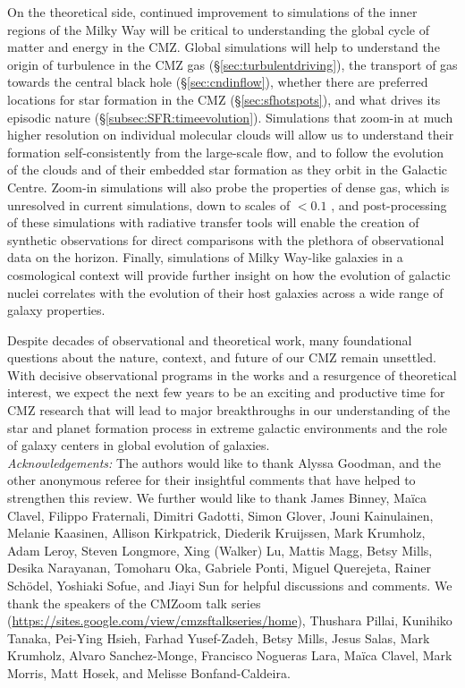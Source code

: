 On the theoretical side, continued improvement to simulations of the inner regions of the Milky Way will be critical to understanding the global cycle of matter and energy in the CMZ. Global simulations  will help to understand the origin of turbulence in the CMZ gas (\S\ref{sec:turbulentdriving}), the transport of gas towards the central black hole (\S\ref{sec:cndinflow}), whether there are preferred locations for star formation in the CMZ (\S\ref{sec:sfhotspots}), and what drives its episodic nature (\S\ref{subsec:SFR:timeevolution}). Simulations that zoom-in at much higher resolution on individual molecular clouds will allow us to understand their formation self-consistently from the large-scale flow, and to follow the evolution of the clouds and of their embedded star formation as they orbit in the Galactic Centre. Zoom-in simulations will also probe the properties of dense gas, which is unresolved in current simulations, down to scales of $<0.1$ \pc, and post-processing of these simulations with radiative transfer tools will enable the creation of synthetic observations for direct comparisons with the plethora of observational data on the horizon. Finally, simulations of Milky Way-like galaxies in a cosmological context will provide further insight on how the evolution of galactic nuclei correlates with the evolution of their host galaxies across a wide range of galaxy properties.

Despite decades of observational and theoretical work, many foundational questions about the nature, context, and future of our CMZ remain unsettled. With decisive observational programs in the works and a resurgence of theoretical interest, we expect the next few years to be an exciting and productive time for CMZ research that will lead to major breakthroughs in our understanding of the star and planet formation process in extreme galactic environments and the role of galaxy centers in global evolution of galaxies.
\\

\noindent\textit{Acknowledgements: } The authors would like to thank Alyssa Goodman, and the other anonymous referee for their insightful comments that have helped to strengthen this review. We further would like to thank James Binney, Maïca Clavel, Filippo Fraternali, Dimitri Gadotti, Simon Glover, Jouni Kainulainen, Melanie Kaasinen, Allison Kirkpatrick, Diederik Kruijssen, Mark Krumholz, Adam Leroy, Steven Longmore, Xing (Walker) Lu, Mattis Magg, Betsy Mills, Desika Narayanan, Tomoharu Oka, Gabriele Ponti, Miguel Querejeta, Rainer Schödel, Yoshiaki Sofue, and Jiayi Sun for helpful discussions and comments. 
We thank the speakers of the CMZoom talk series (\url{https://sites.google.com/view/cmzsftalkseries/home}), Thushara Pillai, Kunihiko Tanaka, Pei-Ying Hsieh, Farhad Yusef-Zadeh, Betsy Mills, Jesus Salas, Mark Krumholz, Alvaro Sanchez-Monge, Francisco Nogueras Lara, Maïca Clavel, Mark Morris, Matt Hosek, and Melisse Bonfand-Caldeira.

